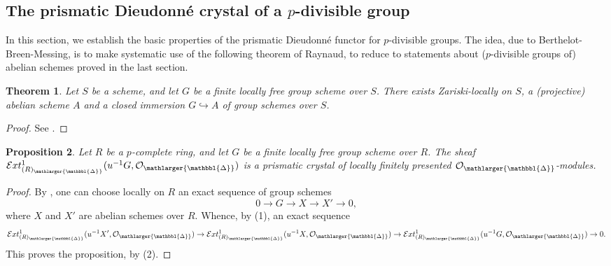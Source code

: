 \documentclass{amsart}
\newcommand{\prism}{{\mathlarger{\mathbbl{\Delta}}}}
\theoremstyle{plain}
\newtheorem{theorem}{Theorem}[subsection]
\newtheorem{proposition}[theorem]{Proposition}
\theoremstyle{definition}
\newcommand{\Ext}{\mathcal{E}xt}
\newcommand{\purple}[1]{{\color{black} #1}}
\newcommand{\red}[1]{{\color{black} #1}}
\begin{document}
%

 



\subsection{The prismatic Dieudonn\'e crystal of a $p$-divisible group}
\label{sec:divid-prism-dieud-definition-for-p-div-groups}

In this section, we establish the basic properties of the prismatic Dieudonn\'e functor for $p$-divisible groups. The idea, due to Berthelot-Breen-Messing, is to make systematic use of the following theorem of Raynaud, to reduce to statements about ($p$-divisible groups of) abelian schemes proved in the last section.
 
 
\begin{theorem}
\label{sec:divid-prism-dieud-definition-for-p-div-groups-theorem-raynaud}
Let $S$ be a scheme, and let $G$ be a finite locally free group scheme over $S$. There exists Zariski-locally on $S$, a (projective) abelian scheme $A$ and a closed immersion $G \hookrightarrow A$ \purple{of group schemes} over $S$.
\end{theorem}
\begin{proof}
See \cite[Theorem 3.1.1]{berthelot_breen_messing_theorie_de_dieudonne_cristalline_II}.
\end{proof} 

\begin{proposition}
\label{sec:divid-prism-dieud-proposition-crystals-loc-finitely-presented}
Let $R$ be a $p$-complete ring, and let $G$ be a finite locally free group scheme over $R$.  The sheaf $\Ext_{(R)_{\prism}}^1(u^{-1}G,\mathcal{O}_ {\prism})$ is a prismatic crystal of locally finitely presented $\mathcal{O}_{\prism}$-modules. 
\end{proposition}
\begin{proof}
By  , one can choose locally on $R$ an exact sequence of group schemes
\[ 0 \to G \to X \to X' \to 0, \]
where $X$ and $X'$ are abelian schemes over $R$. Whence, by  (1), an exact sequence
\[ \Ext_{(R)_{\prism}}^1(u^{-1}X',\mathcal{O}_ {\prism}) \to \Ext_{(R)_{\prism}}^1(u^{-1}X,\mathcal{O}_ {\prism}) \to \Ext_{(R)_{\prism}}^1(u^{-1}G,\mathcal{O}_ {\prism}) \to 0. \]
This proves the proposition, by  (2). 
\end{proof}
\end{document}
